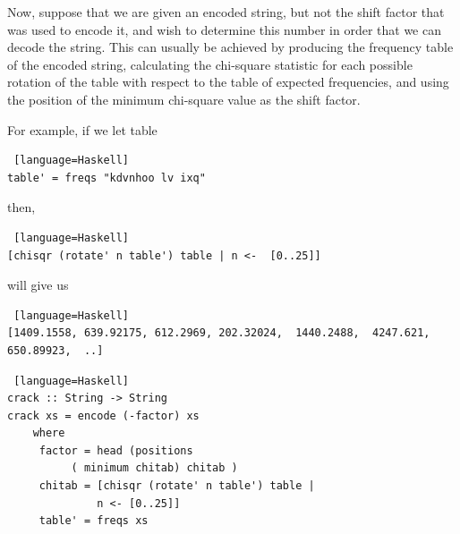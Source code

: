 \documentclass[11pt]{article}
\def\frametitle#1{}
\begin{document}
\begin{frame} [fragile]
   \frametitle{Frequency Tables cont. } 
Now, suppose that we are given an encoded string, but not the shift factor that was used to encode it, 
and wish to determine this number in order that we can decode the string. 
This can usually be achieved by producing the frequency table of the encoded string, 
calculating the chi-square statistic for each possible rotation of the table with respect to the 
table of expected frequencies, and using the position of the minimum chi-square value as the shift factor. 
\end{frame}
 
\begin{frame} [fragile]
   \frametitle{Frequency Tables cont. } 
For example, if we let table 

\begin{onlyenv}
\begin{lstlisting} [language=Haskell]
table' = freqs "kdvnhoo lv ixq"
\end{lstlisting}
 \end{onlyenv}    

then, 
 
   \begin{onlyenv}
  \begin{lstlisting} [language=Haskell]
[chisqr (rotate' n table') table | n <-  [0..25]]
  \end{lstlisting}
\end{onlyenv}    
   will give us
   \begin{onlyenv}
    \begin{lstlisting} [language=Haskell]
[1409.1558, 639.92175, 612.2969, 202.32024,  1440.2488,  4247.621, 650.89923,  ..]
\end{lstlisting}
 \end{onlyenv}    
 \end{frame}
 \begin{frame} [fragile]
    \frametitle{Cracking the Code}

  \begin{onlyenv}
  \begin{lstlisting} [language=Haskell]
crack :: String -> String 
crack xs = encode (-factor) xs
    where
     factor = head (positions  
     	  ( minimum chitab) chitab ) 
     chitab = [chisqr (rotate' n table') table | 
     	      n <- [0..25]]
     table' = freqs xs
\end{lstlisting}
 \end{onlyenv}    
\end{frame}
\end{document}
